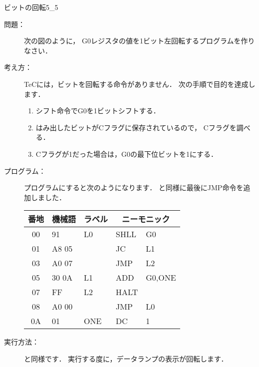 \newpage
\begin{reidai}{ビットの回転}{5_5}
\begin{description}
\item[問題：] 次の図のように，
G0レジスタの値を1ビット左回転するプログラムを作りなさい．

\begin{center}
\end{center}

\item[考え方：]
TeCには，ビットを回転する命令がありません．
次の手順で目的を達成します．
\begin{enumerate}
\item シフト命令でG0を1ビットシフトする．
\item はみ出したビットがCフラグに保存されているので，
Cフラグを調べる．
\item Cフラグが1だった場合は，G0の最下位ビットを1にする．
\end{enumerate}

\begin{center}
\end{center}

\item[プログラム：]
プログラムにすると次のようになります．
と同様に最後にJMP命令を追加しました．

{\tt\small\begin{center}
\begin{tabular}{|c|l|l|l l|} \hline
番地 & 機械語 & ラベル & \multicolumn{2}{|c|}{ニーモニック} \\
\hline
00 & 91    & L0  & SHLL & G0     \\
01 & A8 05 &     & JC   & L1     \\
03 & A0 07 &     & JMP  & L2     \\
05 & 30 0A & L1  & ADD  & G0,ONE \\
07 & FF    & L2  & HALT &        \\
08 & A0 00 &     & JMP  & L0     \\
0A & 01    & ONE & DC   & 1      \\
\hline
\end{tabular}
\end{center}}

\item[実行方法：] と同様です．
実行する度に，データランプの表示が回転します．
\end{description}
\end{reidai}

